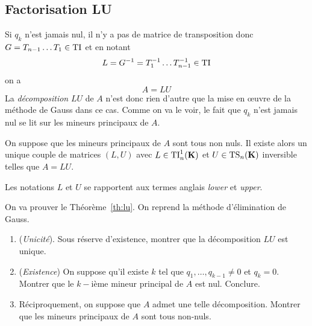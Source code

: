 
\subsection{Factorisation LU}

Si $q_k$ n'est jamais nul, il n'y a pas de matrice de transposition donc $G =
T_{n-1}\dots T_1 \in \mathrm{TI}$ et en notant $$L = G^{-1} = T_1^{-1} \dots
T_{n-1}^{-1} \in \mathrm{TI}$$ on a
\[
A = LU
\]
La \emph{décomposition} $LU$ de $A$ n'est donc rien d'autre que la mise en
\oe uvre de la méthode de Gauss dans ce cas. Comme on va le voir, le fait que
$q_k$ n'est jamais nul se lit sur les mineurs principaux de $A$.

\begin{theorem}
\label{th:lu}
On suppose que les mineurs principaux de $A$ sont tous non nuls. Il existe
alors un unique couple de matrices $(L,U)$ avec $L \in \mathrm{TI}^1_n(\mathbf{K})$ et $U \in
\mathrm{TS}_n(\mathbf{K})$ inversible telles que $A = LU$.
\end{theorem}
\begin{remark}
Les notations $L$ et $U$ se rapportent aux termes anglais \emph{lower} et
\emph{upper}.
\end{remark}
\begin{exercice}
On va prouver le Théorème~\ref{th:lu}. On reprend la méthode d'élimination de
Gauss.
\end{exercice}
\begin{enumerate}
\item (\emph{Unicité}). Sous réserve d'existence, montrer que la
	décomposition $LU$ est unique.
\item (\emph{Existence}) On suppose qu'il existe $k$ tel que
	$q_1,\dots,q_{k-1} \neq 0$ et $q_k = 0$. Montrer que le $k-$ième mineur
	principal de $A$ est nul. Conclure.
\item Réciproquement, on suppose que $A$ admet une telle décomposition.
	Montrer que les mineurs principaux de $A$ sont tous non-nuls.
\end{enumerate}

